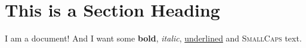 \documentclass[a4paper, 12pt]{article}
\begin{document}
  \section{This is a Section Heading}
  I am a document! And I want some 
  \textbf{bold}, \textit{italic}, 
  \underline{underlined} and 
  \textsc{SmallCaps} text.
\end{document}
